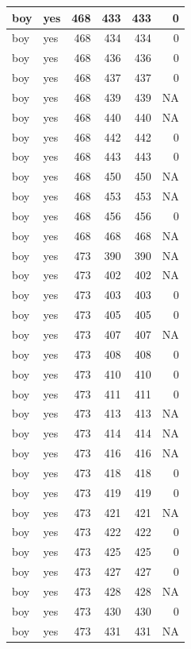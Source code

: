 \documentclass[man]{apa6}
\begin{document}
\begin{tabular}{l|l|r|r|r|r}
\hline
boy & yes & 468 & 433 & 433 & 0\\
\hline
boy & yes & 468 & 434 & 434 & 0\\
\hline
boy & yes & 468 & 436 & 436 & 0\\
\hline
boy & yes & 468 & 437 & 437 & 0\\
\hline
boy & yes & 468 & 439 & 439 & NA\\
\hline
boy & yes & 468 & 440 & 440 & NA\\
\hline
boy & yes & 468 & 442 & 442 & 0\\
\hline
boy & yes & 468 & 443 & 443 & 0\\
\hline
boy & yes & 468 & 450 & 450 & NA\\
\hline
boy & yes & 468 & 453 & 453 & NA\\
\hline
boy & yes & 468 & 456 & 456 & 0\\
\hline
boy & yes & 468 & 468 & 468 & NA\\
\hline
boy & yes & 473 & 390 & 390 & NA\\
\hline
boy & yes & 473 & 402 & 402 & NA\\
\hline
boy & yes & 473 & 403 & 403 & 0\\
\hline
boy & yes & 473 & 405 & 405 & 0\\
\hline
boy & yes & 473 & 407 & 407 & NA\\
\hline
boy & yes & 473 & 408 & 408 & 0\\
\hline
boy & yes & 473 & 410 & 410 & 0\\
\hline
boy & yes & 473 & 411 & 411 & 0\\
\hline
boy & yes & 473 & 413 & 413 & NA\\
\hline
boy & yes & 473 & 414 & 414 & NA\\
\hline
boy & yes & 473 & 416 & 416 & NA\\
\hline
boy & yes & 473 & 418 & 418 & 0\\
\hline
boy & yes & 473 & 419 & 419 & 0\\
\hline
boy & yes & 473 & 421 & 421 & NA\\
\hline
boy & yes & 473 & 422 & 422 & 0\\
\hline
boy & yes & 473 & 425 & 425 & 0\\
\hline
boy & yes & 473 & 427 & 427 & 0\\
\hline
boy & yes & 473 & 428 & 428 & NA\\
\hline
boy & yes & 473 & 430 & 430 & 0\\
\hline
boy & yes & 473 & 431 & 431 & NA\\

\end{tabular}
\end{document}
